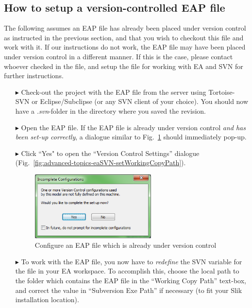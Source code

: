 \subsection{How to setup a version-controlled EAP file}

The following assumes an EAP file has already been placed under version control as instructed in the previous section, and that you wish to checkout this file
and work with it. If our instructions do not work, the EAP file may have been placed under version control in a different manner. If this is the case, please
contact whoever checked in the file, and setup the file for working with EA and SVN for further instructions.

\begin{enumerate}

\item[$\blacktriangleright$] Check-out the project with the EAP file from the server using Tortoise-SVN or Eclipse/Subclipse (or any SVN client of your
choice). You should now have a \textit{.svn}-folder in the directory where you saved the revision.

\item[$\blacktriangleright$] Open the EAP file. If the EAP file is already under version control \emph{and has been set-up correctly}, a dialogue similar to
Fig.~\ref{fig:advanced-topics-eaSVN-incompleteConf} should immediately pop-up.

\item[$\blacktriangleright$] Click ``Yes" to open the ``Version Control Settings'' dialogue (Fig.~\ref{fig:advanced-topics-eaSVN-setWorkingCopyPath}).

\begin{figure}[!htbp]
\begin{center}
	\includegraphics[width=0.6\textwidth]{011}
	\caption{Configure an EAP file which is already under version control}
  	\label{fig:advanced-topics-eaSVN-incompleteConf}
\end{center}
\end{figure}

   \item[$\blacktriangleright$] To work with the EAP file, you now have to \emph{redefine} the SVN variable for the file in your EA workspace.
   To accomplish this, choose the local path to the folder which contains the EAP file in the ``Working Copy Path'' text-box, and correct the value in
   ``Subversion Exe Path'' if necessary (to fit your Slik installation location).


\end{enumerate}
